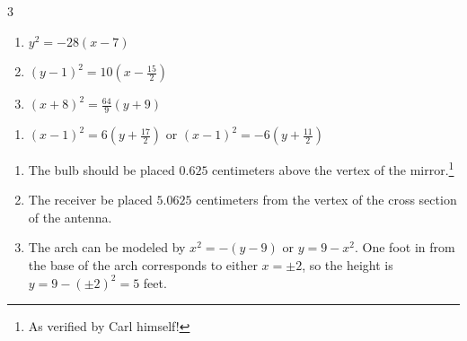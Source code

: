 \documentclass{ximera}
\begin{document}
\begin{multicols}{3}
\begin{enumerate}
\setcounter{enumi}{\value{HW}}

\item $y^{2} = -28(x - 7)$
\item $(y - 1)^{2} = 10\left(x - \frac{15}{2} \right)$
\item $(x + 8)^{2} = \frac{64}{9}(y + 9)$

\setcounter{HW}{\value{enumi}}
\end{enumerate}
\end{multicols}

\begin{enumerate}
\setcounter{enumi}{\value{HW}}


\item $(x - 1)^{2} = 6\left(y + \frac{17}{2}\right)$ or $(x - 1)^{2} = -6\left(y + \frac{11}{2}\right)$

\setcounter{HW}{\value{enumi}}
\end{enumerate}





\begin{enumerate}
\setcounter{enumi}{\value{HW}}

\item  The bulb should be placed $0.625$ centimeters above the vertex of the mirror.\footnote{As verified by Carl himself!}

\item  The receiver be placed $5.0625$ centimeters from the vertex of the cross section of the antenna.

\item  The arch can be modeled by $x^2=-(y-9)$ or $y=9-x^2$.  One foot in from the base of the arch corresponds to either $x = \pm 2$, so the height is $y=9-(\pm 2)^2=5$ feet.

\end{enumerate}
\end{document}
